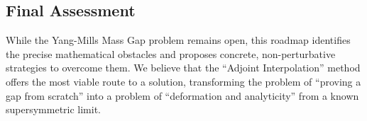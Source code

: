 \subsection{Final Assessment}

While the Yang-Mills Mass Gap problem remains open, this roadmap identifies the precise mathematical obstacles and proposes concrete, non-perturbative strategies to overcome them. We believe that the ``Adjoint Interpolation'' method offers the most viable route to a solution, transforming the problem of ``proving a gap from scratch'' into a problem of ``deformation and analyticity'' from a known supersymmetric limit.


